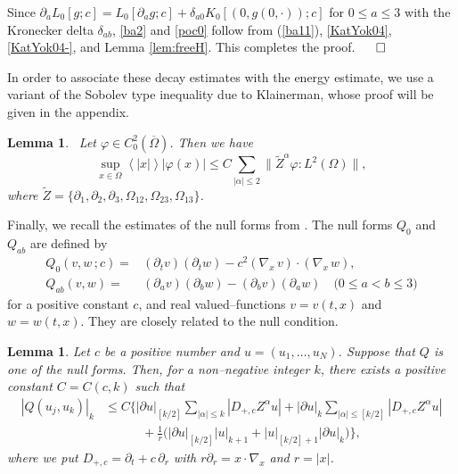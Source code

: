 \documentclass[12pt]{amsart}
\newcommand{\pa}{\partial}
\newcommand{\jb}[1]{\left\langle #1 \right\rangle}
\newtheorem{lemma}[theorem]{Lemma}
\numberwithin{equation}{section}
\begin{document}
Since $\pa_a L_0[g; c]=L_0[\pa_a g; c]+\delta_{a0}K_0[(0, g(0, \cdot)); c]$ 
for $0\le a\le 3$ with the Kronecker delta $\delta_{ab}$,
\eqref{ba2} and \eqref{poc0} follow from (\ref{ba11}), \eqref{KatYok04}, \eqref{KatYok04-}, and Lemma \ref{lem:freeH}.
This completes the proof.
\hfill$\qed$

\vspace{2mm}

In order to associate these decay estimates with the energy estimate,
we use a variant of the Sobolev type inequality due to Klainerman,
whose proof will be given in the appendix.

\begin{lemma}\label{KlainermanSobolev}\
Let $\varphi \in C_0^2(\overline{\Omega})$.
Then we have
\begin{equation}\label{ap21}
\sup_{x \in \Omega} \jb{|x|} |\varphi(x)|
\le C \sum_{|\alpha| \le 2} \|\widetilde{Z}^\alpha \varphi\!:\!{L^2(\Omega)}\|,
\end{equation}
where $\widetilde{Z}=\{\partial_1,\partial_2,\partial_3,\Omega_{12},\Omega_{23},\Omega_{13} \}$.
\end{lemma}



\vspace{2mm}

Finally, we recall the estimates of the null forms 
from \cite{KaKu07}.
The null forms $Q_0$ and $Q_{ab}$
are defined by
\begin{align}
Q_0(v,w\,;c)=&(\pa_t v)(\pa_t w)-c^2 (\nabla_{\!x}\,v)\cdot (\nabla_{\!x}\,w),\\
Q_{ab}(v,w)=&(\pa_a v)(\pa_b w)-(\pa_b v)(\pa_a w) \quad \text{($0\le a<b\le 3$)}
\end{align}
for a positive constant $c$, and real valued--functions $v=v(t,x)$ and $w=w(t,x)$.
They are closely related to the null condition.

\begin{lemma}\label{NFEs}
Let $c$ be a positive number and $u=(u_1, \dots, u_N)$.
Suppose that $Q$ is one of the null forms.
Then, for a non--negative integer $k$, there exists a positive constant $C=C(c,k)$
such that
\begin{align*}
|Q(u_j, u_k)|_k & \le C
\bigl\{
|\pa u|_{[k/2]} \sum_{|\alpha|\le k} |D_{+,c} Z^\alpha u|
{}+|\pa u|_{k} \sum_{|\alpha|\le [k/2]} |D_{+,c} Z^\alpha u|\\
& \qquad\quad {}+\frac{1}{r}\bigl(|\pa u|_{[k/2]}|u|_{k+1}+|u|_{[k/2]+1}|\pa u|_k
 \bigr)
\bigr\},
\end{align*}
where we put $D_{+,c}=\partial_t+c\,\partial_r$ with $r\pa_r=x\cdot\nabla_{\!x}$ and $r=|x|$. 
\end{lemma}
\end{document}
